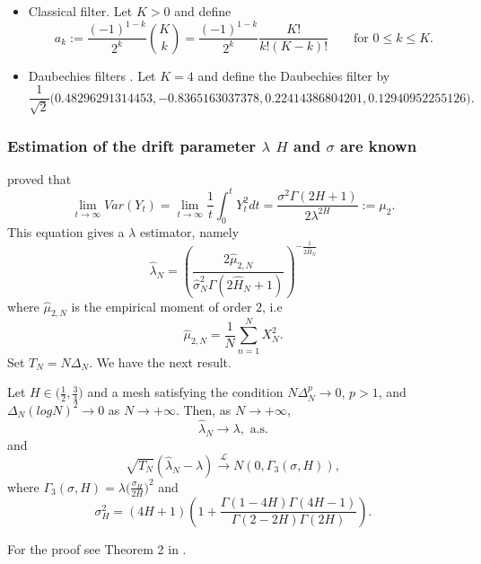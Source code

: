 \documentclass[smallextended]{svjour3}
\begin{document}
    \begin{itemize}
        \item Classical filter. 
        Let $K>0$ and define
        \begin{equation*}
            a_k:= 
            \frac{(-1)^{1-k}}{2^k} 
            {K\choose k} =
            \frac{(-1)^{1-k}}{2^k}
            \frac{K!}{k!(K-k)!}\qquad \mbox{for }  0\le k\le K.
        \end{equation*}

        \item Daubechies filters 
             \citep[see][for original definition]{de}. 
                 Let $K=4$ and define the Daubechies filter by
        \begin{equation*}
            \frac{1}{\sqrt{2}} 
                \big(
                    \num{0.48296291314453}, 
                    \num{-0.8365163037378},
                    \num{0.22414386804201},
                    \num{0.12940952255126}
                \big).
        \end{equation*}
    \end{itemize}

\subsubsection{Estimation of the drift parameter $\lambda$  $H$ and
                $\sigma$ are known}
    \citet{hu-nu} proved that
    \[
        \lim_{t\rightarrow \infty} Var (Y_t)= \lim_{t\rightarrow \infty}
        \frac{1}{t}\int_0^t Y_t^2 dt = \frac{\sigma^2 \Gamma(2H+1) }
        {2\lambda^{2H}}:=\mu_2.
    \]
    This equation gives a $\lambda$ estimator, namely
    \begin{equation} \label{est3}
        \hat{\lambda}_N = 
            \left(
                \dfrac{ 2\hat{\mu}_{2,N} }{ 
                    \hat{\sigma}_N^2 
                    \Gamma(2\hat{H}_N+1)
                }
            \right) ^ {-\tfrac{1}{2\hat{H}_N}}
    \end{equation}
    where $\hat{\mu}_{2,N}$ is the empirical moment of order $2$, i.e
    \[
        \hat{\mu}_{2,N} =
            \dfrac{1}{N}
            \sum_{n=1}^N X_N^2.
    \]
    Set $T_N=N\Delta_N$. We have the next result.
    \begin{theorem}
        Let $H \in \big(\tfrac{1}{2} , \tfrac{3}{4}\big)$ and a mesh satisfying 
        the condition $N \Delta_N^p\rightarrow 0$, $p>1$,
        and $ \Delta_N (log N )^2 \rightarrow 0$ as $N \rightarrow +\infty$. 
        Then,
        as $N \rightarrow +\infty$,
        \[
            \hat{\lambda}_N {\to}  \lambda, \text{ a.s.}
    \]
    and
    \[
        \sqrt{T_N} ( \hat{\lambda}_N -\lambda)
        \stackrel{\mathcal{L}}{\longrightarrow} N (0, \Gamma_3 (\sigma,H)),
    \]
    where 
    $\Gamma_3 (\sigma,H)=\lambda \big(\tfrac{\sigma_H}{2H} \big)^2$ and
    \[
    \sigma_H^2= (4H+1)\left(1+\frac{\Gamma(1-4H)\Gamma(4H-1)
    }{\Gamma(2-2H)\Gamma(2H)} \right).
    \]
\end{theorem}
For the proof see Theorem 2 in \cite{br-ia}.
\end{document}
